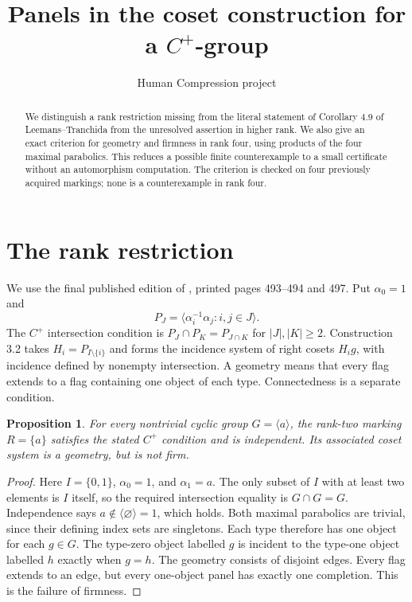 \documentclass[11pt]{article}
\title{Panels in the coset construction for a $C^+$-group}
\author{Human Compression project}
\date{}
\newtheorem{proposition}{Proposition}
\newcommand{\gen}[1]{\langle #1\rangle}
\begin{document}
\maketitle
\begin{abstract}
We distinguish a rank restriction missing from the literal statement of
Corollary 4.9 of Leemans--Tranchida from the unresolved assertion in higher
rank. We also give an exact criterion for geometry and firmness in rank
four, using products of the four maximal parabolics. This reduces a
possible finite counterexample to a small certificate without an
automorphism computation. The criterion is checked on four previously
acquired markings; none is a counterexample in rank four.
\end{abstract}

\section{The rank restriction}
We use the final published edition of \cite{LT}, printed pages 493--494
and 497. Put $\alpha_0=1$ and
\[
 P_J=\gen{\alpha_i^{-1}\alpha_j:i,j\in J}.
\]
The $C^+$ intersection condition is
$P_J\cap P_K=P_{J\cap K}$ for $|J|,|K|\geq2$.
Construction 3.2 takes $H_i=P_{I\setminus\{i\}}$ and forms the incidence
system of right cosets $H_i g$, with incidence defined by nonempty
intersection. A geometry means that every flag extends to a flag
containing one object of each type. Connectedness is a separate condition.

\begin{proposition}
For every nontrivial cyclic group $G=\gen{a}$, the rank-two marking
$R=\{a\}$ satisfies the stated $C^+$ condition and is independent.
Its associated coset system is a geometry, but is not firm.
\end{proposition}
\begin{proof}
Here $I=\{0,1\}$, $\alpha_0=1$, and $\alpha_1=a$.
The only subset of $I$ with at least two elements is $I$ itself, so the
required intersection equality is $G\cap G=G$. Independence says
$a\notin\gen{\varnothing}=1$, which holds.
Both maximal parabolics are trivial, since their defining index sets
are singletons. Each type therefore has one object for each $g\in G$.
The type-zero object labelled $g$ is incident to the type-one object
labelled $h$ exactly when $g=h$. The geometry consists of disjoint edges.
Every flag extends to an edge, but every one-object panel has exactly
one completion. This is the failure of firmness.
\end{proof}
\end{document}

